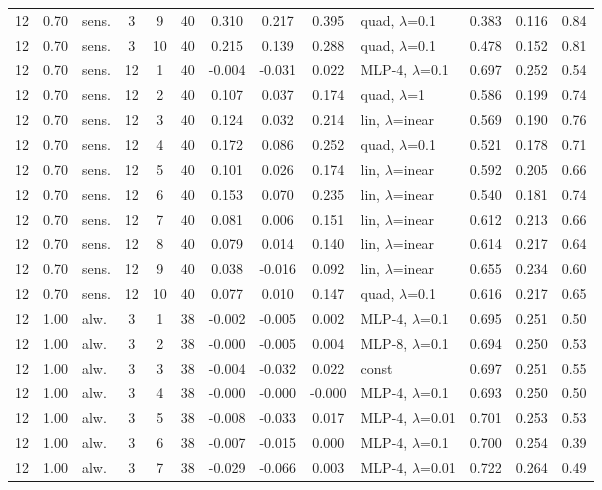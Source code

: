 \begin{scriptsize}
\begin{longtable}{cclcc c ccc l ccc}
12 & 0.70 & sens. & 3 & 9 & 40 & 0.310 & 0.217 & 0.395 & quad, $\lambda$=0.1 & 0.383 & 0.116 & 0.84 \\
12 & 0.70 & sens. & 3 & 10 & 40 & 0.215 & 0.139 & 0.288 & quad, $\lambda$=0.1 & 0.478 & 0.152 & 0.81 \\
12 & 0.70 & sens. & 12 & 1 & 40 & -0.004 & -0.031 & 0.022 & MLP-4, $\lambda$=0.1 & 0.697 & 0.252 & 0.54 \\
12 & 0.70 & sens. & 12 & 2 & 40 & 0.107 & 0.037 & 0.174 & quad, $\lambda$=1 & 0.586 & 0.199 & 0.74 \\
12 & 0.70 & sens. & 12 & 3 & 40 & 0.124 & 0.032 & 0.214 & lin, $\lambda$=inear & 0.569 & 0.190 & 0.76 \\
12 & 0.70 & sens. & 12 & 4 & 40 & 0.172 & 0.086 & 0.252 & quad, $\lambda$=0.1 & 0.521 & 0.178 & 0.71 \\
12 & 0.70 & sens. & 12 & 5 & 40 & 0.101 & 0.026 & 0.174 & lin, $\lambda$=inear & 0.592 & 0.205 & 0.66 \\
12 & 0.70 & sens. & 12 & 6 & 40 & 0.153 & 0.070 & 0.235 & lin, $\lambda$=inear & 0.540 & 0.181 & 0.74 \\
12 & 0.70 & sens. & 12 & 7 & 40 & 0.081 & 0.006 & 0.151 & lin, $\lambda$=inear & 0.612 & 0.213 & 0.66 \\
12 & 0.70 & sens. & 12 & 8 & 40 & 0.079 & 0.014 & 0.140 & lin, $\lambda$=inear & 0.614 & 0.217 & 0.64 \\
12 & 0.70 & sens. & 12 & 9 & 40 & 0.038 & -0.016 & 0.092 & lin, $\lambda$=inear & 0.655 & 0.234 & 0.60 \\
12 & 0.70 & sens. & 12 & 10 & 40 & 0.077 & 0.010 & 0.147 & quad, $\lambda$=0.1 & 0.616 & 0.217 & 0.65 \\
12 & 1.00 & alw. & 3 & 1 & 38 & -0.002 & -0.005 & 0.002 & MLP-4, $\lambda$=0.1 & 0.695 & 0.251 & 0.50 \\
12 & 1.00 & alw. & 3 & 2 & 38 & -0.000 & -0.005 & 0.004 & MLP-8, $\lambda$=0.1 & 0.694 & 0.250 & 0.53 \\
12 & 1.00 & alw. & 3 & 3 & 38 & -0.004 & -0.032 & 0.022 & const & 0.697 & 0.251 & 0.55 \\
12 & 1.00 & alw. & 3 & 4 & 38 & -0.000 & -0.000 & -0.000 & MLP-4, $\lambda$=0.1 & 0.693 & 0.250 & 0.50 \\
12 & 1.00 & alw. & 3 & 5 & 38 & -0.008 & -0.033 & 0.017 & MLP-4, $\lambda$=0.01 & 0.701 & 0.253 & 0.53 \\
12 & 1.00 & alw. & 3 & 6 & 38 & -0.007 & -0.015 & 0.000 & MLP-4, $\lambda$=0.1 & 0.700 & 0.254 & 0.39 \\
12 & 1.00 & alw. & 3 & 7 & 38 & -0.029 & -0.066 & 0.003 & MLP-4, $\lambda$=0.01 & 0.722 & 0.264 & 0.49 \\

\end{longtable}
\end{scriptsize}
